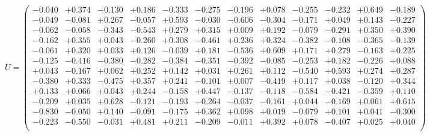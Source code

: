 \documentclass[9pt]{article}
\theoremstyle{plain}
\theoremstyle{definition}
\theoremstyle{remark}
\numberwithin{equation}{section}
\begin{document}
$U = \left(
\begin{array}{
cccccccccccc}
-0.040 & +0.374 & -0.130 & +0.186 & -0.333 & -0.275 & -0.196 & +0.078 & -0.255 & -0.232 & +0.649 & -0.189 \\
-0.049 & -0.081 & +0.267 & -0.057 & +0.593 & -0.030 & -0.606 & -0.304 & -0.171 & +0.049 & +0.143 & -0.227 \\
-0.062 & -0.058 & -0.343 & -0.543 & +0.279 & +0.315 & +0.009 & +0.192 & -0.079 & -0.291 & +0.350 & +0.390 \\
-0.162 & +0.355 & +0.043 & -0.260 & +0.308 & -0.461 & +0.236 & +0.324 & -0.382 & -0.108 & -0.365 & -0.139 \\
-0.061 & +0.320 & +0.033 & +0.126 & -0.039 & +0.181 & -0.536 & +0.609 & +0.171 & +0.279 & -0.163 & +0.225 \\
-0.125 & -0.416 & -0.380 & -0.282 & -0.384 & -0.351 & -0.392 & -0.085 & -0.253 & +0.182 & -0.226 & +0.088 \\
+0.043 & -0.167 & +0.062 & +0.252 & +0.142 & +0.031 & +0.261 & +0.112 & -0.540 & +0.593 & +0.274 & +0.287 \\
-0.380 & +0.333 & -0.475 & +0.357 & +0.241 & -0.101 & +0.007 & -0.419 & +0.117 & +0.038 & -0.120 & +0.344 \\
+0.133 & +0.066 & +0.043 & +0.244 & -0.158 & +0.447 & -0.137 & -0.118 & -0.584 & -0.421 & -0.359 & +0.110 \\
-0.209 & +0.035 & +0.628 & -0.121 & -0.193 & -0.264 & -0.037 & -0.161 & +0.044 & -0.169 & +0.061 & +0.615 \\
-0.830 & -0.050 & +0.140 & -0.091 & -0.175 & +0.362 & +0.098 & +0.019 & -0.079 & +0.101 & +0.041 & -0.300 \\
-0.223 & -0.550 & -0.031 & +0.481 & +0.211 & -0.209 & -0.011 & +0.392 & +0.078 & -0.407 & +0.025 & +0.040 \\
\end{array}
\right)$ \newline 
\end{document}
